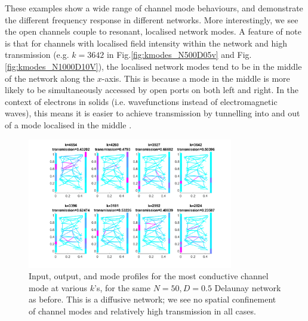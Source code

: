 These examples show a wide range of channel mode behaviours, and demonstrate the different frequency response in different networks. More interestingly, we see the open channels couple to resonant, localised network modes. A feature of note is that for channels with localised field intensity within the network and high transmission (e.g. $k=3642$ in Fig.\ref{fig:kmodes_N500D05v} and Fig.\ref{fig:kmodes_N1000D10V}), the localised network modes tend to be in the middle of the network along the $x$-axis. This is because a mode in the middle is more likely to be simultaneously accessed by open ports on both left and right. In the context of electrons in solids (i.e. wavefunctions instead of electromagnetic waves), this means it is easier to achieve transmission by tunnelling into and out of a mode localised in the middle \cite{Muller2011}.

\begin{figure}[htp]
  \centering
    \includegraphics[width=0.8\textwidth]{ch3/fig3/kmodes_N50D05d.png}
    \caption{Input, output, and mode profiles for the most conductive channel mode at various $k$'s, for the same $N=50, D=0.5$ Delaunay network as before. This is a diffusive network; we see no spatial confinement of channel modes and relatively high transmission in all cases.} 
    \label{fig:kmodes_N50D05d}
\end{figure}

